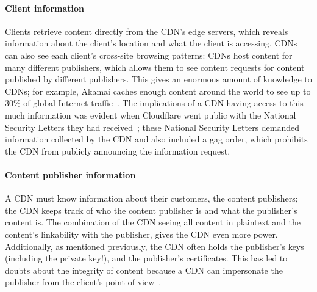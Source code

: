 
\paragraph{Client information} Clients retrieve content directly from the
CDN's edge servers, which reveals
information about the client's location and what the client is accessing.  
CDNs can also see each client's cross-site browsing patterns: CDNs host content
for
many different publishers, which allows 
them to see content requests for content published by different publishers.  This gives an enormous amount of 
knowledge to CDNs; for example, Akamai caches enough content around the world to see up to 30\% of global Internet 
traffic~\cite{akamai_global_traffic}.  The implications of a CDN having access to
this much information was evident when Cloudflare
went public with the National Security Letters they had received~\cite{cloudflare_nsl};
these National Security Letters
demanded information collected by the CDN and also included a gag order, which prohibits
the CDN from publicly announcing the information request.  

\paragraph{Content publisher information} A CDN must know information
about their customers, the content
publishers; the CDN keeps track of who the content publisher is and 
what the publisher's content is.  The combination of the CDN seeing all content in plaintext and the content's 
linkability with the publisher, gives the CDN even more power.  Additionally, as mentioned previously, the CDN often 
holds the publisher's keys (including the private key!), and the publisher's certificates.  This has led to doubts 
about the integrity of content because a CDN can impersonate the publisher from the client's point of view~\cite{levy2015stickler}.

